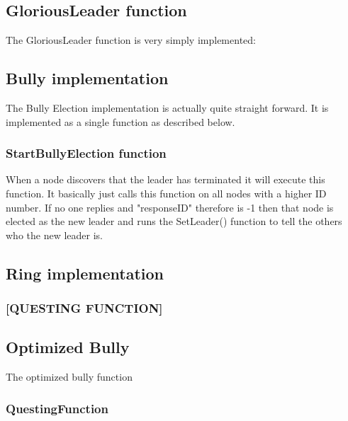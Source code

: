 \subsection{GloriousLeader function}
The GloriousLeader function is very simply implemented:

\begin{center}
\end{center}


\subsection{Bully implementation}
The Bully Election implementation is actually quite straight forward. It is implemented as a single function as described below.

\subsubsection{StartBullyElection function}
When a node discovers that the leader has terminated it will execute this function. It basically just calls this function on all nodes with a higher ID number. If no one replies and "responseID" therefore is -1 then that node is elected as the new leader and runs the SetLeader() function to tell the others who the new leader is. 

\begin{center}
\end{center}

\subsection{Ring implementation}
\subsubsection{[QUESTING FUNCTION]}
\subsection{Optimized Bully}
The optimized bully function
\subsubsection{QuestingFunction}




